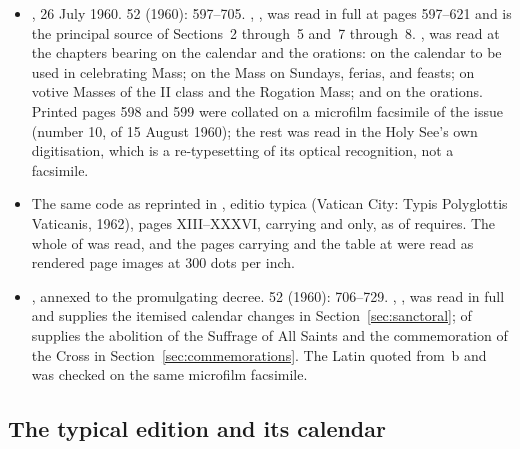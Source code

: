 \begin{itemize}[leftmargin=1.3em, itemsep=0.3em]
\item {}, 26 July 1960.  52 (1960): 597--705. , , was read in
full at pages 597--621 and is the principal source of Sections~2 through~5 and~7 through~8.
, was read at the chapters bearing on the
calendar and the orations:  on the calendar to be used in celebrating Mass;
 on the Mass on Sundays, ferias, and feasts;  on votive Masses of the
II class and the Rogation Mass; and  on the orations. Printed pages 598 and 599
were collated on a microfilm facsimile of the issue (number 10, of 15 August 1960); the rest was
read in the Holy See's own digitisation, which is a re-typesetting of its optical recognition,
not a facsimile.
\item The same code as reprinted in , editio typica (Vatican City: Typis
Polyglottis Vaticanis, 1962), pages XIII--XXXVI, carrying  and  only, as  of  requires. The whole of  was read, and the pages carrying  and the table at  were read as
rendered page images at 300 dots per inch.
\item {},
annexed to the promulgating decree.  52 (1960): 706--729.
, , was read in full and supplies the
itemised calendar changes in Section~\ref{sec:sanctoral};  of  supplies
the abolition of the Suffrage of All Saints and the commemoration of the Cross in
Section~\ref{sec:commemorations}. The Latin quoted from \,b and  was checked on the same
microfilm facsimile.
\end{itemize}

\subsection{The typical edition and its calendar}

